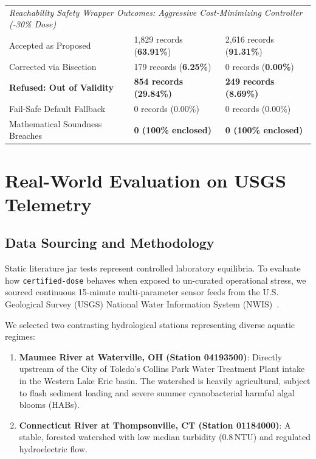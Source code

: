 \documentclass[10pt,twocolumn,letterpaper]{article}
\theoremstyle{definition}
\begin{document}
\begin{table}[t]
\begin{tabularx}{\textwidth}{lXX}
\midrule
\multicolumn{3}{l}{\textit{Reachability Safety Wrapper Outcomes: Aggressive Cost-Minimizing Controller (-30\% Dose)}} \\
Accepted as Proposed & 1,829 records (\textbf{63.91\%}) & 2,616 records (\textbf{91.31\%}) \\
Corrected via Bisection & 179 records (\textbf{6.25\%}) & 0 records (\textbf{0.00\%}) \\
\textbf{Refused: Out of Validity} & \textbf{854 records (29.84\%)} & \textbf{249 records (8.69\%)} \\
Fail-Safe Default Fallback & 0 records (0.00\%) & 0 records (0.00\%) \\
Mathematical Soundness Breaches & \textbf{0 (100\% enclosed)} & \textbf{0 (100\% enclosed)} \\
\bottomrule
\end{tabularx}
\end{table}

\section{Real-World Evaluation on USGS Telemetry}

\subsection{Data Sourcing and Methodology}
Static literature jar tests represent controlled laboratory equilibria. To evaluate how \texttt{certified-dose} behaves when exposed to un-curated operational stress, we sourced continuous 15-minute multi-parameter sensor feeds from the U.S. Geological Survey (USGS) National Water Information System (NWIS)~\cite{usgs2024nwis}. 

We selected two contrasting hydrological stations representing diverse aquatic regimes:
\begin{enumerate}
    \item \textbf{Maumee River at Waterville, OH (Station 04193500)}: Directly upstream of the City of Toledo's Collins Park Water Treatment Plant intake in the Western Lake Erie basin. The watershed is heavily agricultural, subject to flash sediment loading and severe summer cyanobacterial harmful algal blooms (HABs).
    \item \textbf{Connecticut River at Thompsonville, CT (Station 01184000)}: A stable, forested watershed with low median turbidity ($0.8\,\text{NTU}$) and regulated hydroelectric flow.
\end{enumerate}
\end{document}
